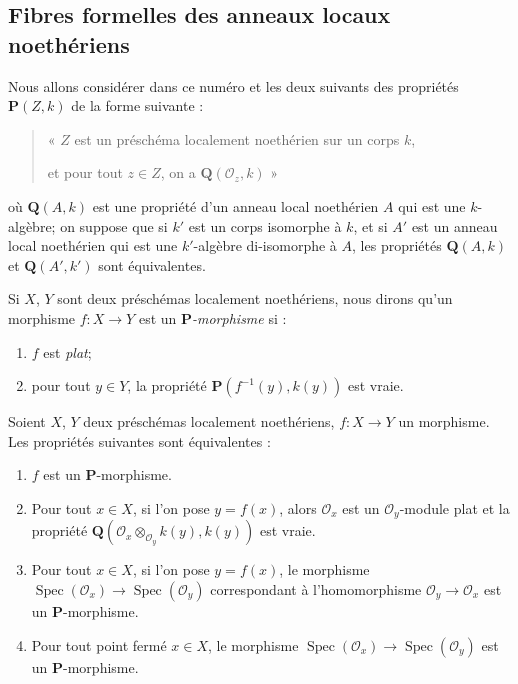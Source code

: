 \subsection{Fibres formelles des anneaux locaux noethériens}
\label{subsection:IV.7.3-fr}

\begin{env}[7.3.1]
\label{IV.2.s7.3.1-fr}
Nous allons considérer dans ce numéro et les deux suivants des propriétés
$\boldsymbol P(Z,k)$ de la forme suivante :
\begin{quote}
« $Z$ est un préschéma localement noethérien sur un corps $k$,

et pour tout $z\in Z$, on a $\boldsymbol Q(\mathscr O_z,k)$ »
\end{quote}
où $\boldsymbol Q(A,k)$ est une propriété d'un anneau local noethérien $A$
qui est une $k$-algèbre; on suppose que si $k'$ est un corps isomorphe à
$k$, et si $A'$ est un anneau local noethérien qui est une $k'$-algèbre
di-isomorphe à $A$, les propriétés $\boldsymbol Q(A,k)$ et
$\boldsymbol Q(A',k')$ sont équivalentes.
\end{env}


Si $X$, $Y$ sont deux préschémas localement noethériens, nous dirons qu'un
morphisme $f:X\to Y$ est un \emph{$\boldsymbol P$-morphisme} si :
\begin{enumerate}
\item[1\textsuperscript{o}] $f$ est \emph{plat};
\item[2\textsuperscript{o}] pour tout $y\in Y$, la propriété
$\boldsymbol P(f^{-1}(y),k(y))$ est vraie.
\end{enumerate}

\begin{lemma}[7.3.2]
\label{IV.2.s7.3.2-fr}
Soient $X$, $Y$ deux préschémas localement noethériens,
$f:X\to Y$ un morphisme. Les propriétés suivantes sont équivalentes :
\begin{enumerate}
\item[\emph{a)}] $f$ est un $\boldsymbol P$-morphisme.
\item[\emph{b)}] Pour tout $x\in X$, si l'on pose $y=f(x)$, alors $\mathscr O_x$ est
un $\mathscr O_y$-module plat et la propriété
$\boldsymbol Q(\mathscr O_x\otimes_{\mathscr O_y}k(y),k(y))$ est vraie.
\item[\emph{c)}] Pour tout $x\in X$, si l'on pose $y=f(x)$, le morphisme
$\operatorname{Spec}(\mathscr O_x)\to\operatorname{Spec}(\mathscr O_y)$
correspondant à l'homomorphisme $\mathscr O_y\to\mathscr O_x$ est un
$\boldsymbol P$-morphisme.
\item[\emph{c$'$)}] Pour tout point fermé $x\in X$, le morphisme
$\operatorname{Spec}(\mathscr O_x)\to\operatorname{Spec}(\mathscr O_y)$
est un $\boldsymbol P$-morphisme.
\end{enumerate}
\end{lemma}


